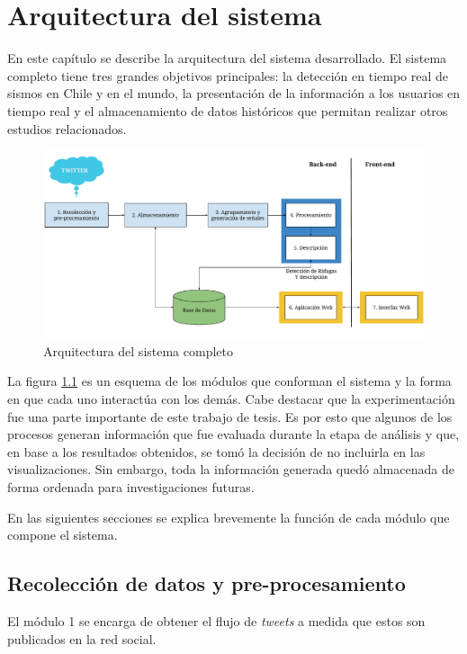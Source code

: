 \chapter{Arquitectura del sistema}
\label{cap:arquitectura}

En este capítulo se describe la arquitectura del sistema desarrollado. El sistema completo tiene tres grandes  objetivos principales: la detección en tiempo real de sismos en Chile y en el mundo, la presentación de la información a los usuarios en tiempo real y el almacenamiento de datos históricos que permitan realizar otros estudios relacionados.

\begin{figure}[h]
	\centering
	\includegraphics[width=\linewidth]{imagenes/Arquitectura.pdf}
	\caption{Arquitectura del sistema completo}
	\label{img:arquitectura}
\end{figure}

La figura \ref{img:arquitectura} es un esquema de los módulos que conforman el sistema y la forma en que cada uno interactúa con los demás. 
%
Cabe destacar que la experimentación fue una parte importante de este trabajo de tesis. Es por esto que algunos de los procesos generan información que fue evaluada durante la etapa de análisis y que, en base a los resultados obtenidos, se tomó la decisión de no incluirla en las visualizaciones. 
%
Sin embargo, toda la información generada quedó almacenada de forma ordenada para investigaciones futuras. 

En las siguientes secciones se explica brevemente la función de cada módulo que compone el sistema.

\section{Recolección de datos y pre-procesamiento}
\label{sec:recoleccion}
El módulo 1 se encarga de obtener el flujo de \textit{tweets} a medida que estos son publicados en la red social. 

